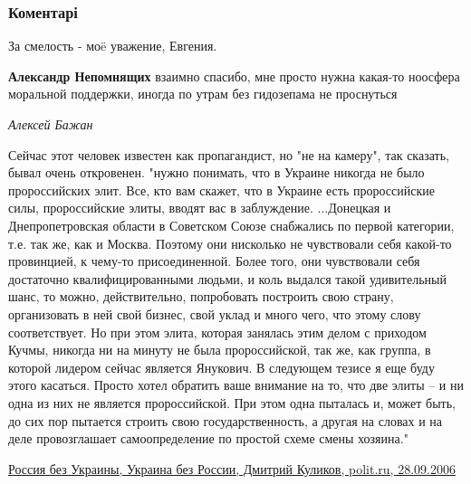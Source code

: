  
 
 
 
 
\subsubsection{Коментарі}
\label{sec:19_10_2021.fb.bilchenko_evgenia.1.oppozicia_pismo.cmt}

\begin{itemize} %
За смелость - моë уважение, Евгения.

\begin{itemize} %
\textbf{Александр Непомнящих} взаимно спасибо, мне просто нужна какая-то ноосфера моральной поддержки, иногда по утрам без гидозепама не проснуться
\end{itemize} %

\emph{Алексей Бажан}

Сейчас этот человек известен как пропагандист, но "не на камеру", так сказать,
бывал очень откровенен. "нужно понимать, что в Украине никогда не было
пророссийских элит. Все, кто вам скажет, что в Украине есть пророссийские силы,
пророссийские элиты, вводят вас в заблуждение. ...Донецкая и Днепропетровская
области в Советском Союзе снабжались по первой категории, т.е. так же, как и
Москва. Поэтому они нисколько не чувствовали себя какой-то провинцией, к
чему-то присоединенной. Более того, они чувствовали себя достаточно
квалифицированными людьми, и коль выдался такой удивительный шанс, то можно,
действительно, попробовать построить свою страну, организовать в ней свой
бизнес, свой уклад и много чего, что этому слову соответствует. Но при этом
элита, которая занялась этим делом с приходом Кучмы, никогда ни на минуту не
была пророссийской, так же, как группа, в которой лидером сейчас является
Янукович. В следующем тезисе я еще буду этого касаться. Просто хотел обратить
ваше внимание на то, что две элиты – и ни одна из них не является
пророссийской. При этом одна пыталась и, может быть, до сих пор пытается
строить свою государственность, а другая на словах и на деле провозглашает
самоопределение по простой схеме смены хозяина."

\href{https://polit.ru/article/2006/09/28/kulikov/}{%
Россия без Украины, Украина без России, Дмитрий Куликов, polit.ru, 28.09.2006
}


\end{itemize}
